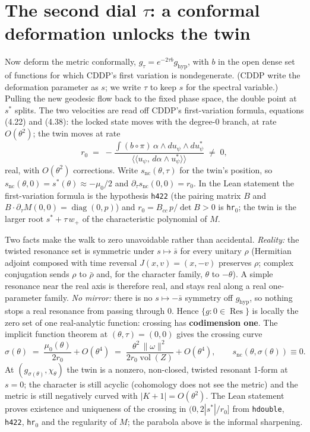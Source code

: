 \documentclass[11pt]{article}
\begin{document}
\section{The second dial $\tau$: a conformal deformation unlocks the twin}

Now deform the metric conformally, $g_\tau = e^{-2\tau b} g_{\mathrm{hyp}}$, with $b$ in the
open dense set of functions for which CDDP's first variation is nondegenerate. (CDDP write the
deformation parameter as $s$; we write $\tau$ to keep $s$ for the spectral variable.) Pulling
the new geodesic flow back to the fixed phase space, the double point at $s^*$ splits. The two
velocities are read off CDDP's first-variation formula, equations (4.22) and (4.38): the locked
state moves with the degree-0 branch, at rate $O(\theta^2)$; the twin moves at rate
\[
r_0 \;=\; -\frac{\int (b\circ\pi)\,\alpha\wedge du_\psi\wedge du_\psi^*}{\langle\!\langle u_\psi,\, d\alpha\wedge u_\psi^*\rangle\!\rangle}
\;\neq\; 0 ,
\]
real, with $O(\theta^2)$ corrections. Write $s_{\mathrm{nc}}(\theta,\tau)$ for the twin's
position, so $s_{\mathrm{nc}}(\theta,0) = s^*(\theta) \approx -\mu_0/2$ and
$\partial_\tau s_{\mathrm{nc}}(0,0) = r_0$. In the Lean statement the first-variation formula
is the hypothesis \texttt{h422} (the pairing matrix $B$ and $B\cdot\partial_\tau M(0,0) =
\operatorname{diag}(0,p)$) and $r_0 = B_{cc}\,p/\det B > 0$ is \texttt{hr}$_0$; the twin is the
larger root $s^* + \tau\,w_+$ of the characteristic polynomial of $M$.

Two facts make the walk to zero unavoidable rather than accidental. \emph{Reality:} the twisted
resonance set is symmetric under $s \mapsto \bar s$ for every unitary $\rho$ (Hermitian adjoint
composed with time reversal $J(x,v) = (x,-v)$ preserves $\rho$; complex conjugation sends $\rho$
to $\bar\rho$ and, for the character family, $\theta$ to $-\theta$). A simple resonance near the
real axis is therefore real, and stays real along a real one-parameter family. \emph{No mirror:}
there is no $s \mapsto -\bar s$ symmetry off $g_{\mathrm{hyp}}$, so nothing stops a real
resonance from passing through $0$. Hence $\{g : 0 \in \operatorname{Res}\}$ is locally the zero
set of one real-analytic function: crossing has \textbf{codimension one}. The implicit function
theorem at $(\theta,\tau) = (0,0)$ gives the crossing curve
\[
\sigma(\theta) \;=\; \frac{\mu_0(\theta)}{2 r_0} + O(\theta^4)
\;=\; \frac{\theta^2\,\|\omega\|^2}{2 r_0 \operatorname{vol}(Z)} + O(\theta^4),
\qquad s_{\mathrm{nc}}(\theta, \sigma(\theta)) \equiv 0 .
\]
At $(g_{\sigma(\theta)}, \chi_\theta)$ the twin is a nonzero, non-closed, twisted resonant 1-form
at $s = 0$; the character is still acyclic (cohomology does not see the metric) and the metric is
still negatively curved with $|K+1| = O(\theta^2)$. The Lean statement proves existence and
uniqueness of the crossing in $(0, 2|s^*|/r_0]$ from \texttt{hdouble}, \texttt{h422},
\texttt{hr}$_0$ and the regularity of $M$; the parabola above is the informal sharpening.
\end{document}
